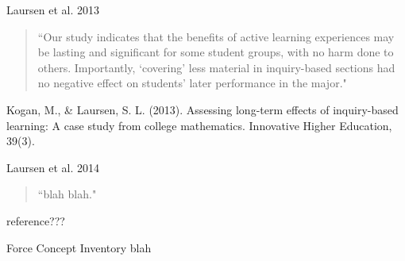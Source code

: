 \documentclass[10pt,handout]{beamer}
\begin{document}
\begin{frame}

\begin{block}{Laursen et al. 2013}
\begin{quote}
``Our study indicates that the benefits of active learning experiences may be lasting and significant for some student groups, with no harm done to others. Importantly, ‘covering’ less material in inquiry-based sections had no negative effect on students’ later performance in the major."
\end{quote}

\vspace{1em}

Kogan, M., & Laursen, S. L. (2013).  Assessing long-term effects of inquiry-based learning:  A case study from college mathematics.  Innovative Higher Education, 39(3).
\end{block}

\end{frame}


\begin{frame}

\begin{block}{Laursen et al. 2014}
\begin{quote}
``blah blah."
\end{quote}

\vspace{1em}

reference???
\end{block}

\end{frame}


\begin{frame}

\begin{block}{Force Concept Inventory}
blah
\end{block}

\end{frame}

\end{document}
